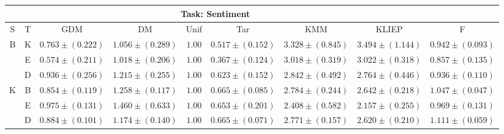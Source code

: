 \documentclass[twoside,11pt]{article}
\newcommand{\1}{\mat{1}}
\begin{document}
\renewcommand{\arraystretch}{.8}
\begin{table}[t]
\vspace{.1in}
\begin{center}
\begin{tabular}{ccccccccc}
 \hline
  \multicolumn{8}{c}{\small{Task: Sentiment}} \\ \hline
\tiny{S} & \tiny{T} & \tiny{GDM} & \tiny{DM} & \tiny{Unif} &\tiny{Tar} & \tiny{KMM} & \tiny{KLIEP} & \tiny{F} \\  \hline
\multirow{3}{*}{ \tiny{B}} & \tiny{K} & $\mathbf{\scriptscriptstyle{ 0.763
    \pm ( 0.222 )}}$ & $\scriptscriptstyle{ 1.056   \pm ( 0.289 )}$ &
$\scriptscriptstyle{1.00}$ & $\scriptscriptstyle{ 0.517   \pm ( 0.152 )}$ & $\scriptscriptstyle{ 3.328   \pm ( 0.845 )}$ & $\scriptscriptstyle{ 3.494   \pm ( 1.144 )}$ & $\scriptscriptstyle{ 0.942   \pm ( 0.093 )}$\\
& \tiny{E} & $\mathbf{\scriptscriptstyle{ 0.574   \pm ( 0.211 )}}$ &
$\scriptscriptstyle{ 1.018   \pm ( 0.206 )}$ &$\scriptscriptstyle{1.00}$ & $\scriptscriptstyle{ 0.367   \pm ( 0.124 )}$ & $\scriptscriptstyle{ 3.018   \pm ( 0.319 )}$ & $\scriptscriptstyle{ 3.022   \pm ( 0.318 )}$ & $\scriptscriptstyle{ 0.857   \pm ( 0.135 )}$\\
& \tiny{D} & $\scriptscriptstyle{ 0.936   \pm ( 0.256 )}$ & $\scriptscriptstyle{
  1.215   \pm ( 0.255 )}$ & $\scriptscriptstyle{1.00}$ & $\scriptscriptstyle{ 0.623   \pm ( 0.152 )}$ & $\scriptscriptstyle{ 2.842   \pm ( 0.492 )}$ & $\scriptscriptstyle{ 2.764   \pm ( 0.446 )}$ & $\mathbf{\scriptscriptstyle{ 0.936   \pm ( 0.110 )}}$\\
\hline
 \multirow{3}{*}{ \tiny{K}} & \tiny{B} & $\mathbf{\scriptscriptstyle{
     0.854   \pm ( 0.119 )}}$ & $\scriptscriptstyle{ 1.258   \pm ( 0.117
   )}$& $\scriptscriptstyle{1.00}$ & $\scriptscriptstyle{ 0.665   \pm ( 0.085 )}$ & $\scriptscriptstyle{ 2.784   \pm ( 0.244 )}$ & $\scriptscriptstyle{ 2.642   \pm ( 0.218 )}$ & $\scriptscriptstyle{ 1.047   \pm ( 0.047 )}$\\
& \tiny{E} & $\scriptscriptstyle{ 0.975   \pm ( 0.131 )}$ & $\scriptscriptstyle{
  1.460   \pm ( 0.633 )}$ & $\scriptscriptstyle{1.00}$& $\scriptscriptstyle{ 0.653   \pm ( 0.201 )}$ & $\scriptscriptstyle{ 2.408   \pm ( 0.582 )}$ & $\scriptscriptstyle{ 2.157   \pm ( 0.255 )}$ & $\mathbf{\scriptscriptstyle{ 0.969   \pm ( 0.131 )}}$\\
& \tiny{D} & $\mathbf{\scriptscriptstyle{ 0.884   \pm ( 0.101 )}}$ & $\scriptscriptstyle{ 1.174   \pm ( 0.140 )}$ &$\scriptscriptstyle{1.00}$& $\scriptscriptstyle{ 0.665   \pm ( 0.071 )}$ & $\scriptscriptstyle{ 2.771   \pm ( 0.157 )}$ & $\scriptscriptstyle{ 2.620   \pm ( 0.210 )}$ & $\scriptscriptstyle{ 1.111   \pm ( 0.059 )}$\\

\end{tabular}
\end{center}
\end{table}
\end{document}
